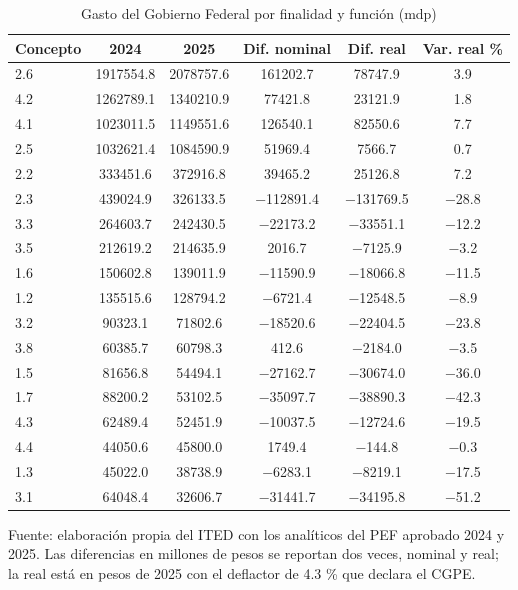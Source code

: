 \begin{table}[htbp]
\centering
\caption{Gasto del Gobierno Federal por finalidad y función (mdp)}
\label{tab:C4_4}
\footnotesize
\setlength{\tabcolsep}{4pt}
\begin{tabular}{L{3.4cm}SSSSS}
\toprule
{Concepto} & {2024} & {2025} & {Dif. nominal} & {Dif. real} & {Var. real \%} \\
\midrule
\num{2.6} & \num{1917554.8} & \num{2078757.6} & \num{161202.7} & \num{78747.9} & \num{3.9} \\
\num{4.2} & \num{1262789.1} & \num{1340210.9} & \num{77421.8} & \num{23121.9} & \num{1.8} \\
\num{4.1} & \num{1023011.5} & \num{1149551.6} & \num{126540.1} & \num{82550.6} & \num{7.7} \\
\num{2.5} & \num{1032621.4} & \num{1084590.9} & \num{51969.4} & \num{7566.7} & \num{0.7} \\
\num{2.2} & \num{333451.6} & \num{372916.8} & \num{39465.2} & \num{25126.8} & \num{7.2} \\
\num{2.3} & \num{439024.9} & \num{326133.5} & \num{-112891.4} & \num{-131769.5} & \num{-28.8} \\
\num{3.3} & \num{264603.7} & \num{242430.5} & \num{-22173.2} & \num{-33551.1} & \num{-12.2} \\
\num{3.5} & \num{212619.2} & \num{214635.9} & \num{2016.7} & \num{-7125.9} & \num{-3.2} \\
\num{1.6} & \num{150602.8} & \num{139011.9} & \num{-11590.9} & \num{-18066.8} & \num{-11.5} \\
\num{1.2} & \num{135515.6} & \num{128794.2} & \num{-6721.4} & \num{-12548.5} & \num{-8.9} \\
\num{3.2} & \num{90323.1} & \num{71802.6} & \num{-18520.6} & \num{-22404.5} & \num{-23.8} \\
\num{3.8} & \num{60385.7} & \num{60798.3} & \num{412.6} & \num{-2184.0} & \num{-3.5} \\
\num{1.5} & \num{81656.8} & \num{54494.1} & \num{-27162.7} & \num{-30674.0} & \num{-36.0} \\
\num{1.7} & \num{88200.2} & \num{53102.5} & \num{-35097.7} & \num{-38890.3} & \num{-42.3} \\
\num{4.3} & \num{62489.4} & \num{52451.9} & \num{-10037.5} & \num{-12724.6} & \num{-19.5} \\
\num{4.4} & \num{44050.6} & \num{45800.0} & \num{1749.4} & \num{-144.8} & \num{-0.3} \\
\num{1.3} & \num{45022.0} & \num{38738.9} & \num{-6283.1} & \num{-8219.1} & \num{-17.5} \\
\num{3.1} & \num{64048.4} & \num{32606.7} & \num{-31441.7} & \num{-34195.8} & \num{-51.2} \\
\bottomrule
\end{tabular}
\par\vspace{2pt}\footnotesize Fuente: elaboración propia del ITED con los analíticos del PEF aprobado 2024 y 2025. Las diferencias en millones de pesos se reportan dos veces, nominal y real; la real está en pesos de 2025 con el deflactor de 4.3 \% que declara el CGPE.
\end{table}
